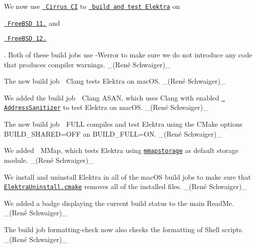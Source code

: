 \begin{DoxyItemize}
\item We now use \href{https://cirrus-ci.com}{\texttt{ Cirrus CI}} to \href{http://cirrus-ci.com/github/ElektraInitiative/libelektra}{\texttt{ build and test Elektra}} on
\begin{DoxyItemize}
\item \href{https://www.freebsd.org/releases/11.2R/announce.html}{\texttt{ Free\+B\+SD 11.}} and
\item \href{https://www.freebsd.org/releases/12.0R/announce.html}{\texttt{ Free\+B\+SD 12.}}
\end{DoxyItemize}

. Both of these build jobs use {\ttfamily -\/Werror} to make sure we do not introduce any code that produces compiler warnings. \+\_\+(René Schwaiger)\+\_\+
\item The new build job {\ttfamily 🍎 Clang} tests Elektra on mac\+OS. \+\_\+(René Schwaiger)\+\_\+
\item We added the build job {\ttfamily 🍎 Clang A\+S\+AN}, which uses Clang with enabled \href{https://en.wikipedia.org/wiki/AddressSanitizer}{\texttt{ Address\+Sanitizer}} to test Elektra on mac\+OS. \+\_\+(René Schwaiger)\+\_\+
\item The new build job {\ttfamily 🍎 F\+U\+LL} compiles and test Elektra using the C\+Make options {\ttfamily B\+U\+I\+L\+D\+\_\+\+S\+H\+A\+R\+ED=O\+FF} an {\ttfamily B\+U\+I\+L\+D\+\_\+\+F\+U\+LL=ON}. \+\_\+(René Schwaiger)\+\_\+
\item We added {\ttfamily 🍎 M\+Map}, which tests Elektra using \href{https://www.libelektra.org/plugins/mmapstorage}{\texttt{ {\ttfamily mmapstorage}}} as default storage module. \+\_\+(René Schwaiger)\+\_\+
\item We install and uninstall Elektra in all of the mac\+OS build jobs to make sure that \href{https://master.libelektra.org/scripts/cmake/ElektraUninstall.cmake}{\texttt{ {\ttfamily Elektra\+Uninstall.\+cmake}}} removes all of the installed files. \+\_\+(René Schwaiger)\+\_\+
\end{DoxyItemize}


\begin{DoxyItemize}
\item We added a badge displaying the current build status to the main Read\+Me. \+\_\+(René Schwaiger)\+\_\+
\item The build job {\ttfamily formatting-\/check} now also checks the formatting of Shell scripts. \+\_\+(René Schwaiger)\+\_\+
\end{DoxyItemize}


